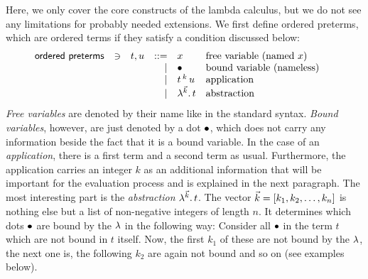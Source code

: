 \documentclass[submission,copyright,creativecommons]{eptcs}
\begin{document}
Here, we only cover the core constructs of the lambda calculus, but we do not see any limitations for probably needed extensions. We first define ordered preterms, which are ordered terms if they satisfy a condition discussed below:
\[
\begin{array}{lllrll@{\qquad}}
\mathsf{ordered \ preterms}       & \ni & t,u & ::= & x & \mbox{free variable (named $x$)} \\
			                   &&& \mid & \ovar & \mbox{bound variable (nameless)} \\
			                   &&& \mid & \ApO t k u & \mbox{application} \\
			                   &&& \mid & \LaO {\vec k} t & \mbox{abstraction} \\
\end{array}
\]
\emph{Free variables} are denoted by their name like in the standard syntax. \emph{Bound variables}, however, are just denoted by a dot $\mathord{\bullet}$, which does not carry any information beside the fact that it is a bound variable. 
In the case of an \emph{application}, there is a first term and a second term as usual. 
Furthermore, the application carries an integer $k$ as an additional information that will be important for the evaluation process and is explained in the next paragraph.
The most interesting part is the \emph{abstraction} $\lambda ^{\vec k} . \, t$. The vector $\vec k = [k_1, k_2, \ldots, k_n]$ is nothing else but a list of non-negative  integers of length $n$. It determines which dots $\mathord{\bullet}$ are bound by the $\lambda$ in the following way: Consider all $\mathord{\bullet}$ in the term $t$ which are not bound in $t$ itself. Now, the first $k_1$ of these are not bound by the $\lambda$, the next one is, the following $k_2$ are again not bound and so on (see examples below). 
\end{document}
